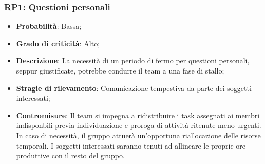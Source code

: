 \subsubsection{RP1: Questioni personali}
\begin{itemize}
    \item \textbf{Probabilità}: Bassa;
    \item \textbf{Grado di criticità}: Alto;
    \item \textbf{Descrizione}: La necessità di un periodo di fermo per questioni personali, seppur giustificate, potrebbe condurre il team a una fase di stallo;
    \item \textbf{Stragie di rilevamento}: Comunicazione tempestiva da parte dei soggetti interessati;
    \item \textbf{Contromisure}: Il team si impegna a ridistribuire i task assegnati ai membri indisponbili previa individuazione e proroga di attività ritenute meno urgenti. In caso di necessità, il gruppo attuerà un'opportuna riallocazione delle risorse temporali. I soggetti interessati saranno tenuti ad allineare le proprie ore produttive con il resto del gruppo.
\end{itemize}